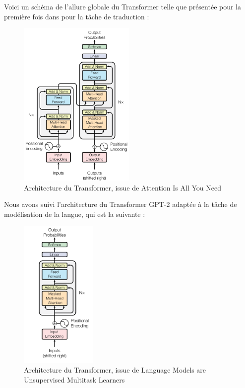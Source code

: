 Voici un schéma de l'allure globale du Transformer telle que présentée pour la première fois dans \cite{vaswani2017attention} pour la tâche de traduction :
\begin{figure}[h]
  \begin{center}
  \includegraphics[width=0.5\textwidth]{img/architecture_transformer.png}
  \end{center}
  \caption{Architecture du Transformer, issue de \og Attention Is All You Need \fg{}\cite{vaswani2017attention}}
  \label{fig:transformer}
\end{figure}

Nous avons suivi l'architecture du Transformer GPT-2\cite{radford2019gpt2} adaptée à la tâche de modélisation de la langue, qui est la suivante :
\begin{figure}[h!]
  \begin{center}
  \includegraphics[width=0.33\textwidth]{img/architecture_transformer_gpt2.png}
  \end{center}
  \caption{Architecture du Transformer, issue de \og Language Models are Unsupervised Multitask Learners \fg{}\cite{radford2019gpt2}}
  \label{fig:transformer_gpt2}
\end{figure}

